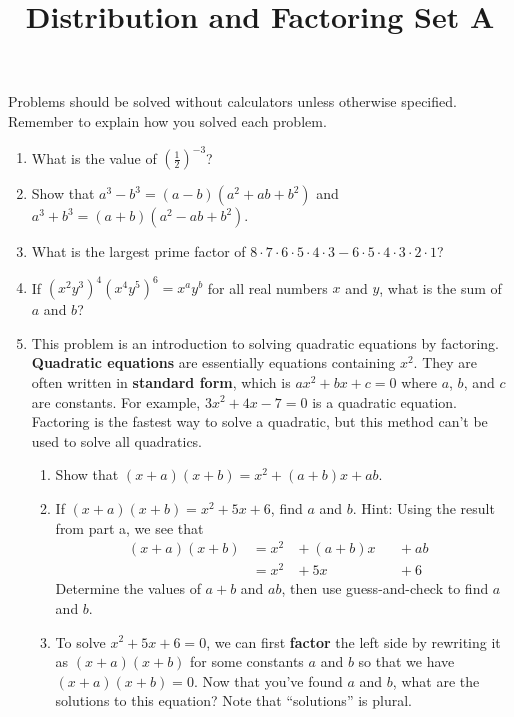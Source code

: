\documentclass{article}
\title{Distribution and Factoring Set A}
\author{}
\date{}
\begin{document}
    \maketitle
    \noindent Problems should be solved without calculators unless otherwise
    specified. Remember to explain how you solved each problem.
    \begin{enumerate}
        \item What is the value of $\left(\frac{1}{2}\right)^{-3}$?
        \vspace{3cm}
        \item Show that $a^3 - b^3 = (a - b)(a^2 + ab + b^2)$ and $a^3 + b^3 =
        (a + b)(a^2 - ab + b^2)$.
        \vspace{3cm}
        \item What is the largest prime factor of $8 \cdot 7 \cdot 6 \cdot 5
        \cdot 4 \cdot 3 - 6 \cdot 5 \cdot 4 \cdot 3 \cdot 2 \cdot 1$?
        \vspace{3cm}
        \item If $(x^2 y^3)^4 (x^4 y^5)^6 = x^a y^b$ for all real numbers $x$
        and $y$, what is the sum of $a$ and $b$?
        \vspace{3cm}
        \item This problem is an introduction to solving quadratic equations by
        factoring. \textbf{Quadratic equations} are essentially equations
        containing $x^2$. They are often written in \textbf{standard form},
        which is $ax^2 + bx + c = 0$ where $a$, $b$, and $c$ are constants. For
        example, $3x^2 + 4x - 7 = 0$ is a quadratic equation. Factoring is the
        fastest way to solve a quadratic, but this method can't be used to solve
        all quadratics.
        \begin{enumerate}
            \item Show that $(x + a)(x + b) = x^2 + (a + b)x + ab$.
            \vspace{3cm}
            \item If $(x + a)(x + b) = x^2 + 5x + 6$, find $a$ and $b$. Hint:
            Using the result from part a, we see that
            \[\begin{alignedat}{3} (x + a)(x + b) & = x^2 &{} + (a + b)x &&{} +
                ab &\\
                & = x^2 &{} + 5x &&{} + 6 & \end{alignedat}\] Determine the
            values of $a + b$ and $ab$, then use guess-and-check to find $a$ and
            $b$.
            \vspace{3cm}
            \item To solve $x^2 + 5x + 6 = 0$, we can first \textbf{factor} the
            left side by rewriting it as $(x + a)(x + b)$ for some constants $a$
            and $b$ so that we have $(x + a)(x + b) = 0$. Now that you've found
            $a$ and $b$, what are the solutions to this equation? Note that
            ``solutions'' is plural.
            \vspace{3cm}
        \end{enumerate}
    \end{enumerate}
\end{document}
